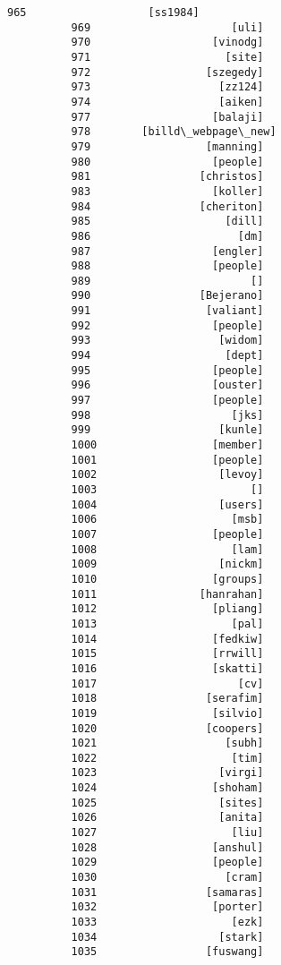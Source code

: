 \documentclass[11pt]{article}
\begin{document}
\begin{Verbatim}[commandchars=\\\{\}]
          965                   [ss1984]
          969                      [uli]
          970                   [vinodg]
          971                     [site]
          972                  [szegedy]
          973                    [zz124]
          974                    [aiken]
          977                   [balaji]
          978        [billd\_webpage\_new]
          979                  [manning]
          980                   [people]
          981                 [christos]
          983                   [koller]
          984                 [cheriton]
          985                     [dill]
          986                       [dm]
          987                   [engler]
          988                   [people]
          989                         []
          990                 [Bejerano]
          991                  [valiant]
          992                   [people]
          993                    [widom]
          994                     [dept]
          995                   [people]
          996                   [ouster]
          997                   [people]
          998                      [jks]
          999                    [kunle]
          1000                  [member]
          1001                  [people]
          1002                   [levoy]
          1003                        []
          1004                   [users]
          1006                     [msb]
          1007                  [people]
          1008                     [lam]
          1009                   [nickm]
          1010                  [groups]
          1011                [hanrahan]
          1012                  [pliang]
          1013                     [pal]
          1014                  [fedkiw]
          1015                  [rrwill]
          1016                  [skatti]
          1017                      [cv]
          1018                 [serafim]
          1019                  [silvio]
          1020                 [coopers]
          1021                    [subh]
          1022                     [tim]
          1023                   [virgi]
          1024                  [shoham]
          1025                   [sites]
          1026                   [anita]
          1027                     [liu]
          1028                  [anshul]
          1029                  [people]
          1030                    [cram]
          1031                 [samaras]
          1032                  [porter]
          1033                     [ezk]
          1034                   [stark]
          1035                 [fuswang]

\end{Verbatim}
\end{document}
